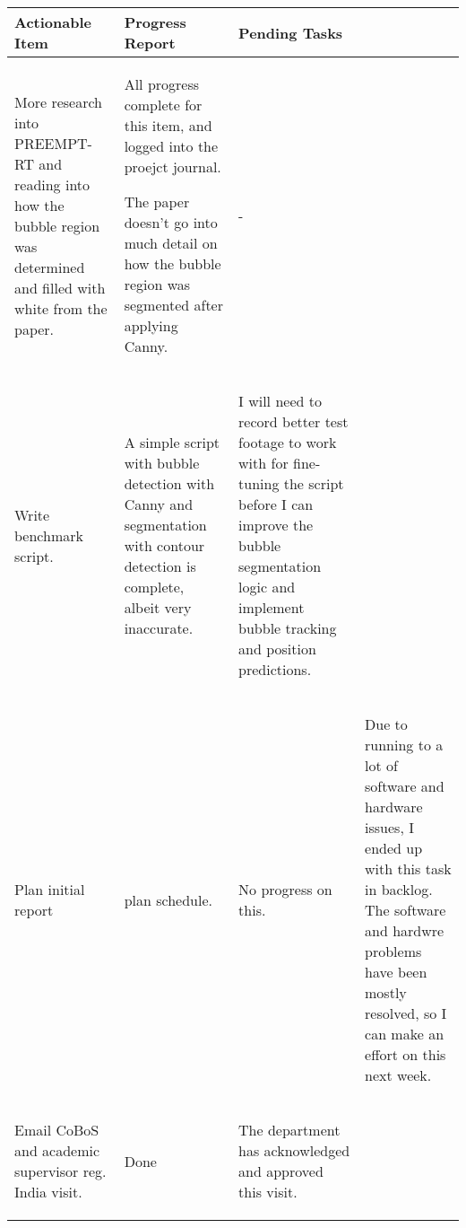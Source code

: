 \begin{table}[!h]
    \centering
    \begin{tabularx}{\textwidth}{|X|X|X|}
        \hline
        Actionable Item & Progress Report & Pending Tasks \\
        \hline
        \hline
        More research into PREEMPT-RT and reading into how the bubble region was determined and filled with white from the paper. & 
        \begin{myitemize}
            \item All progress complete for this item, and logged into the proejct journal.
            \item The paper doesn't go into much detail on how the bubble region was segmented after applying Canny.
        \end{myitemize} & 
        - \\
        \hline
        Write benchmark script. & 
        \begin{myitemize}
            \item A simple script with bubble detection with Canny and segmentation with contour detection is complete, albeit very inaccurate.
        \end{myitemize} & 
        \begin{myitemize}
            \item I will need to record better test footage to work with for fine-tuning the script before I can improve the bubble segmentation logic and implement bubble tracking and position predictions.
        \end{myitemize} \\
        \hline
        Plan initial report & plan schedule. & 
        \begin{myitemize}
            \item No progress on this.
        \end{myitemize} & 
        \begin{myitemize}
            \item Due to running to a lot of software and hardware issues, I ended up with this task in backlog. The software and hardwre problems have been mostly resolved, so I can make an effort on this next week.
        \end{myitemize} \\
        \hline
        Email CoBoS and academic supervisor reg. India visit. & 
        \begin{myitemize}
            \item Done
        \end{myitemize} & 
        \begin{myitemize}
            \item The department has acknowledged and approved this visit.
        \end{myitemize} \\
        \hline
    \end{tabularx}
\end{table}
